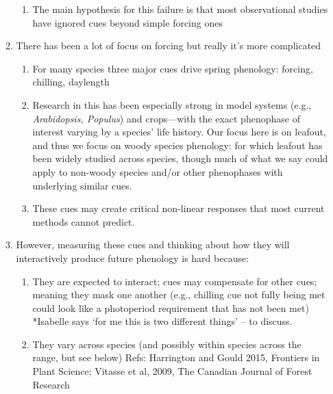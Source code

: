 \documentclass[11pt,letterpaper]{article}
\begin{document}
\begin{enumerate}
\begin{enumerate}
\begin{enumerate}
\item The main hypothesis for this failure is that  most observational studies have ignored cues beyond simple forcing ones %
\end{enumerate}
\item There has been a lot of focus on forcing but really it's more complicated
\begin{enumerate}
\item For many species three major cues drive spring phenology: forcing, chilling, daylength
\item Research in this has been especially strong in model systems (e.g., \emph{Arabidopsis, Populus}) and crops---with the exact phenophase of interest varying by a species' life history. Our focus here is on leafout, and thus we focus on woody species phenology: for which leafout has been widely studied across species, though much of what we say could apply to non-woody species and/or other phenophases with underlying similar cues. 

\item These cues may create critical non-linear responses that most current methods cannot predict.
\end{enumerate}
\item However, measuring these cues and thinking about how they will interactively produce future phenology is hard because:
\begin{enumerate}
\item They are expected to interact; cues may compensate for other cues; meaning they mask one another (e.g., chilling cue not fully being met could look like a photoperiod requirement that has not been met) *Isabelle says `for me this is two different things' -- to discuss.
\item They vary across species (and possibly within species across the range, but see below) Refs: Harrington and Gould 2015, Frontiers in Plant Science; Vitasse et al, 2009, The Canadian Journal of Forest Research


\end{enumerate}
\end{enumerate}
\end{enumerate}
\end{document}
